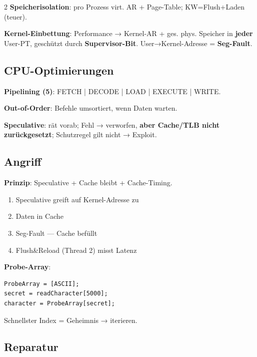 \documentclass[10pt, a4paper]{article}
\begin{document}
\begin{multicols}{2}
\textbf{Speicherisolation}: pro Prozess virt. AR + Page-Table; KW=Flush+Laden (teuer).


\textbf{Kernel-Einbettung}: Performance → Kernel-AR + ges. phys. Speicher in \textbf{jeder} User-PT, geschützt durch \textbf{Supervisor-Bit}. User→Kernel-Adresse = \textbf{Seg-Fault}.



\subsection{CPU-Optimierungen}

\textbf{Pipelining (5)}: FETCH | DECODE | LOAD | EXECUTE | WRITE.


\textbf{Out-of-Order}: Befehle umsortiert, wenn Daten warten.


\textbf{Speculative}: rät vorab; Fehl → verworfen, \textbf{aber Cache/TLB nicht zurückgesetzt}; Schutzregel gilt nicht → Exploit.



\subsection{Angriff}

\textbf{Prinzip}: Speculative + Cache bleibt + Cache-Timing.


\begin{enumerate}
  \item Speculative greift auf Kernel-Adresse zu
  \item Daten in Cache
  \item Seg-Fault — Cache befüllt
  \item Flush\&Reload (Thread 2) misst Latenz
\end{enumerate}

\textbf{Probe-Array}:

\begin{lstlisting}
ProbeArray = [ASCII];
secret = readCharacter[5000];
character = ProbeArray[secret];
\end{lstlisting}

Schnellster Index = Geheimnis → iterieren.



\subsection{Reparatur}



\end{multicols}
\end{document}

